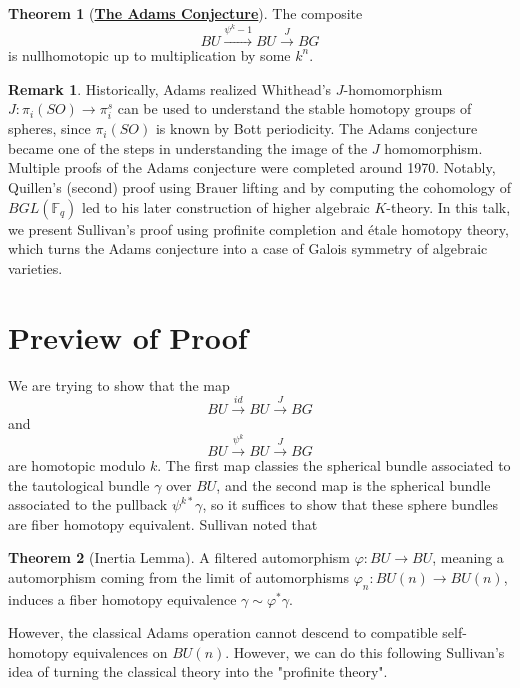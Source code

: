 \documentclass{article}
\theoremstyle{definition}
\newtheorem{theorem}{Theorem}[section]
\theoremstyle{definition}
\theoremstyle{definition}
\newtheorem{remark}{Remark}[theorem]
\theoremstyle{definition}
\theoremstyle{definition}
\theoremstyle{definition}
\theoremstyle{definition}
\begin{document}
	\begin{tcolorbox}[colback=red!5!white,colframe=red!30!white]
	\begin{theorem}[\underline{\textbf{The Adams Conjecture}}]
	The composite 
	\[BU\xrightarrow{\psi^k-1}BU\xrightarrow{J}BG\]
	is nullhomotopic up to multiplication by some $k^n$. 
	\end{theorem}
	\end{tcolorbox}
	
	
	\begin{tcolorbox}[colback=green!5!white,colframe=green!30!white]
	\begin{remark}
	Historically, Adams realized Whithead's $J$-homomorphism $J: \pi_i(SO)\to \pi^s_i$ can be used to understand the stable homotopy groups of spheres, since $\pi_i(SO)$ is known by Bott periodicity. The Adams conjecture became one of the steps in understanding the image of the $J$ homomorphism. \\

	Multiple proofs of the Adams conjecture were completed around 1970. Notably, Quillen's (second) proof using Brauer lifting and by computing the cohomology of $BGL(\mathbb{F}_q)$ led to his later construction of higher algebraic $K$-theory. In this talk, we present Sullivan's proof using profinite completion and \'etale homotopy theory, which turns the Adams conjecture into a case of Galois symmetry of algebraic varieties.


	\end{remark}
	\end{tcolorbox}



\section{Preview of Proof}

We are trying to show that the map
\[BU\xrightarrow{id} BU\xrightarrow{J}BG\]
and 
\[BU\xrightarrow{\psi^k} BU\xrightarrow{J}BG\]
are homotopic modulo $k$. The first map classies the spherical bundle associated to the tautological bundle $\gamma$ over $BU$, and the second map is the spherical bundle associated to the pullback $\psi^{k*}\gamma$, so it suffices to show that these sphere bundles are fiber homotopy equivalent. Sullivan noted that 


\begin{tcolorbox}[colback=red!5!white,colframe=red!30!white]
\begin{theorem}[Inertia Lemma]
A filtered automorphism $\varphi: BU\to BU$, meaning a automorphism coming from the limit of automorphisms $\varphi_n:BU(n)\to BU(n)$, induces a fiber homotopy equivalence $\gamma\sim \varphi^* \gamma$. 
\end{theorem}
\end{tcolorbox}
However, the classical Adams operation cannot descend to compatible self-homotopy equivalences on $BU(n)$. However, we can do this following Sullivan's idea of turning the classical theory into the "profinite theory".
\end{document}

